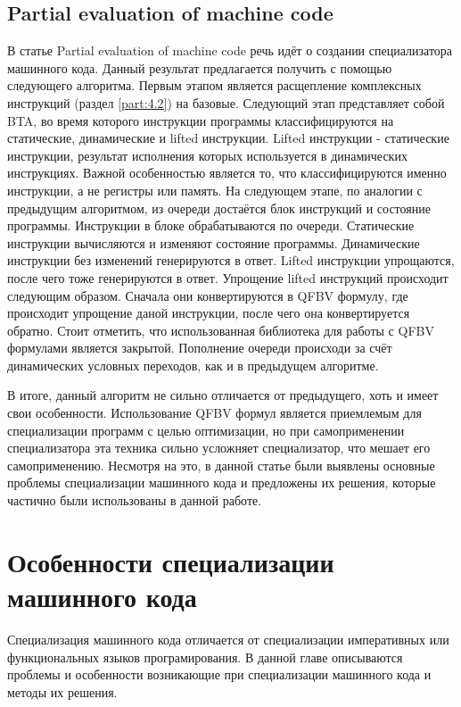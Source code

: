 \documentclass{spbau-diploma}
\begin{document}
\subsection{Partial evaluation of machine code}
В статье Partial evaluation of machine code\cite{PEMC} речь идёт о создании специализатора машинного кода. Данный результат предлагается получить с помощью следующего алгоритма. Первым этапом является расщепление комплексных инструкций (раздел \ref{part:4.2}) на базовые. Следующий этап представляет собой BTA, во время которого инструкции программы классифицируются на статические, динамические и lifted инструкции. Lifted инструкции - статические инструкции, результат исполнения которых используется в динамических инструкциях. Важной особенностью является то, что классифицируются именно инструкции, а не регистры или память. На следующем этапе, по аналогии с предыдущим алгоритмом, из очереди достаётся блок инструкций и состояние программы. Инструкции в блоке обрабатываются по очереди. Статические инструкции вычисляются и изменяют состояние программы. Динамические инструкции без изменений генерируются в ответ. Lifted инструкции упрощаются, после чего тоже генерируются в ответ. Упрощение lifted инструкций происходит следующим образом. Сначала они конвертируются в QFBV\cite{QFBV} формулу, где происходит упрощение даной инструкции, после чего она конвертируется обратно. Стоит отметить, что использованная библиотека для работы с QFBV формулами является закрытой. Пополнение очереди происходи за счёт динамических условных переходов, как и в предыдущем алгоритме.

В итоге, данный алгоритм не сильно отличается от предыдущего, хоть и имеет свои особенности. Использование QFBV формул является приемлемым для специализации программ с целью оптимизации, но при самоприменении специализатора эта техника сильно усложняет специализатор, что мешает его самоприменению. Несмотря на это, в данной статье были выявлены основные проблемы специализации машинного кода и предложены их решения, которые частично были использованы в данной работе. 

\section{Особенности специализации машинного кода}

Специализация машинного кода отличается от специализации императивных или функциональных языков програмирования. В данной главе описываются проблемы и особенности возникающие при специализации машинного кода и методы их решения.
\end{document}
